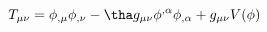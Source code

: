 \begin{equation}
  \label{eq:set1}
  T_{\mu\nu}= \phi_{,\mu}\phi_{,\nu}-
  \tha g_{\mu\nu}\phi^{,\alpha}\phi_{,\alpha}
  + g_{\mu\nu}V(\phi)
\end{equation}

